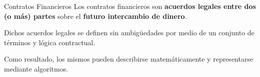 \documentclass{beamer}
\begin{document}
\begin{frame}{Contratos Financieros}
Los contratos financieros son \textbf{acuerdos legales entre dos (o más) partes} sobre el \textbf{futuro intercambio de dinero}. 

\vfill

Dichos acuerdos legales se definen sin ambigüedades por medio de un conjunto de términos y lógica contractual.

\pause
\vfill

Como resultado, los mismos pueden describirse matemáticamente y representarse mediante algoritmos.

\end{frame}






\end{document}
